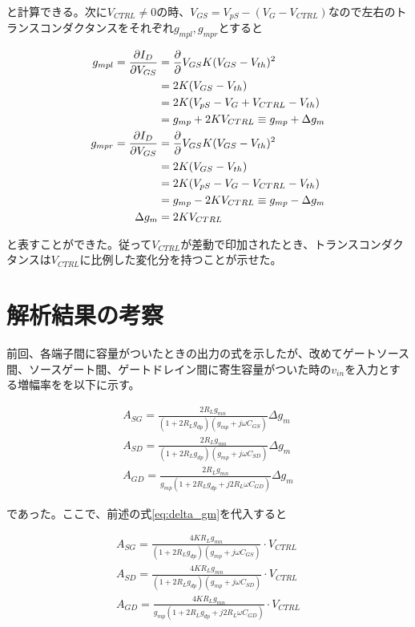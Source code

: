 \documentclass[twocolumn]{jsarticle}
\begin{document}
と計算できる。次に$V_{CTRL}\neq0$の時、$V_{GS}=V_{pS}- \left( V_{G}-V_{CTRL} \right)$なので左右のトランスコンダクタンスをそれぞれ$g_{mpl},g_{mpr}$とすると

\begin{align}
    g_{mpl} = \frac{\partial I_{D}}{\partial V_{GS}} &= \frac{\partial}{\partial }V_{GS} K(V_{GS}-V_{th})^{2} \notag\\
    &=2K(V_{GS}-V_{th})    \notag\\ 
    &=2K(V_{pS}-V_{G}+V_{CTRL}-V_{th})  \notag\\
    &=g_{mp}+2KV_{CTRL}\equiv g_{mp}+\Delta g_{m}   \label{eq:g_mpl}\\
    g_{mpr} = \frac{\partial I_{D}}{\partial V_{GS}} &= \frac{\partial}{\partial }V_{GS} K(V_{GS}-V_{th})^{2} \notag\\
    &=2K(V_{GS}-V_{th})    \notag\\ 
    &=2K(V_{pS}-V_{G}-V_{CTRL}-V_{th})  \notag\\
    &=g_{mp}-2KV_{CTRL}\equiv g_{mp}-\Delta g_{m}   \label{eq:g_mpr}\\
    \Delta g_{m}&=2KV_{CTRL}   \label{eq:delta_gm}
\end{align}

と表すことができた。従って$V_{CTRL}$が差動で印加されたとき、トランスコンダクタンスは$V_{CTRL}$に比例した変化分を持つことが示せた。

\section{解析結果の考察}
前回、各端子間に容量がついたときの出力の式を示したが、改めてゲートソース間、ソースゲート間、ゲートドレイン間に寄生容量がついた時の$v_{in}$を入力とする増幅率をを以下に示す。

\begin{align*}
    A_{SG}=\frac{2R_{L}g_{mn}}{ (1+2R_{L}g_{dp})(g_{mp}+j\omega C_{GS}) }\Delta g_{m}  \\
    A_{SD}=\frac{2R_{L}g_{mn}}{ (1+2R_{L}g_{dp})(g_{mp}+j\omega C_{SD}) }\Delta g_{m}  \\
    A_{GD}=\frac{2R_{L}g_{mn} }{ g_{mp}(1+2R_{L}g_{dp} + j2R_{L}\omega C_{GD}) }\Delta g_{m}  
\end{align*}

であった。ここで、前述の式\eqref{eq:delta_gm}を代入すると

\begin{align}
    A_{SG}=\frac{4KR_{L}g_{mn} }{ (1+2R_{L}g_{dp})(g_{mp}+j\omega C_{GS}) }\cdot V_{CTRL}  \label{eq:a_sg}\\
    A_{SD}=\frac{4KR_{L}g_{mn} }{ (1+2R_{L}g_{dp})(g_{mp}+j\omega C_{SD}) }\cdot V_{CTRL}  \label{eq:a_sd}\\
    A_{GD}=\frac{4KR_{L}g_{mn} }{ g_{mp}(1+2R_{L}g_{dp} + j2R_{L}\omega C_{GD}) }\cdot V_{CTRL}    \label{eq:a_gd}
\end{align}
\end{document}
